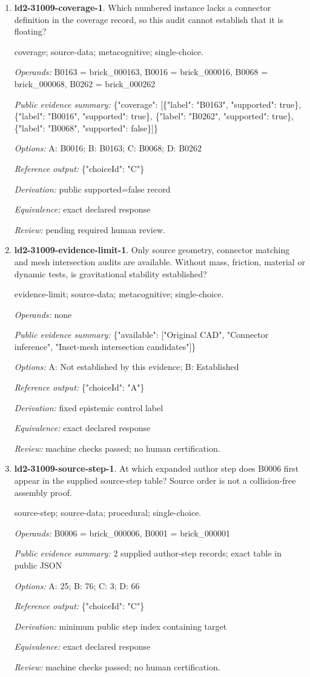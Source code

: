 \begin{enumerate}
\item \textbf{ld2-31009-coverage-1}. Which numbered instance lacks a connector definition in the coverage record, so this audit cannot establish that it is floating?
\par{\small coverage; source-data; metacognitive; single-choice.\par\textit{Operands:} B0163 = brick\_000163, B0016 = brick\_000016, B0068 = brick\_000068, B0262 = brick\_000262\par\textit{Public evidence summary:} \{"coverage": [\{"label": "B0163", "supported": true\}, \{"label": "B0016", "supported": true\}, \{"label": "B0262", "supported": true\}, \{"label": "B0068", "supported": false\}]\}\par\textit{Options:} A: B0016; B: B0163; C: B0068; D: B0262\par\textit{Reference output:} \{"choiceId": "C"\}\par\textit{Derivation:} public supported=false record\par\textit{Equivalence:} exact declared response\par\textit{Review:} pending required human review.}
\item \textbf{ld2-31009-evidence-limit-1}. Only source geometry, connector matching and mesh intersection audits are available. Without mass, friction, material or dynamic tests, is gravitational stability established?
\par{\small evidence-limit; source-data; metacognitive; single-choice.\par\textit{Operands:} none\par\textit{Public evidence summary:} \{"available": ["Original CAD", "Connector inference", "Inset-mesh intersection candidates"]\}\par\textit{Options:} A: Not established by this evidence; B: Established\par\textit{Reference output:} \{"choiceId": "A"\}\par\textit{Derivation:} fixed epistemic control label\par\textit{Equivalence:} exact declared response\par\textit{Review:} machine checks passed; no human certification.}
\item \textbf{ld2-31009-source-step-1}. At which expanded author step does B0006 first appear in the supplied source-step table? Source order is not a collision-free assembly proof.
\par{\small source-step; source-data; procedural; single-choice.\par\textit{Operands:} B0006 = brick\_000006, B0001 = brick\_000001\par\textit{Public evidence summary:} 2 supplied author-step records; exact table in public JSON\par\textit{Options:} A: 25; B: 76; C: 3; D: 66\par\textit{Reference output:} \{"choiceId": "C"\}\par\textit{Derivation:} minimum public step index containing target\par\textit{Equivalence:} exact declared response\par\textit{Review:} machine checks passed; no human certification.}

\end{enumerate}
